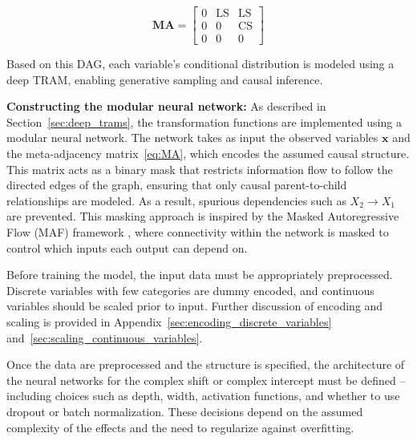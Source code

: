 \begin{equation}
\mathbf{MA} =
\begin{bmatrix}
  0 & \text{LS} & \text{LS} \\
  0 & 0  & \text{CS} \\
  0 & 0  & 0
\end{bmatrix}
\label{eq:MA}
\end{equation}

Based on this DAG, each variable's conditional distribution is modeled using a deep TRAM, enabling generative sampling and causal inference. 

% 

%
\textbf{Constructing the modular neural network:} As described in Section~\ref{sec:deep_trams}, the transformation functions are implemented using a modular neural network. The network takes as input the observed variables $\mathbf{x}$ and the meta-adjacency matrix~\ref{eq:MA}, which encodes the assumed causal structure. This matrix acts as a binary mask that restricts information flow to follow the directed edges of the graph, ensuring that only causal parent-to-child relationships are modeled. As a result, spurious dependencies such as $X_2 \rightarrow X_1$ are prevented. This masking approach is inspired by the Masked Autoregressive Flow (MAF) framework \citep{papamakarios2017}, where connectivity within the network is masked to control which inputs each output can depend on.

Before training the model, the input data must be appropriately preprocessed. Discrete variables with few categories are dummy encoded, and continuous variables should be scaled prior to input. Further discussion of encoding and scaling is provided in Appendix~\ref{sec:encoding_discrete_variables} and~\ref{sec:scaling_continuous_variables}.

Once the data are preprocessed and the structure is specified, the architecture of the neural networks for the complex shift or complex intercept must be defined -- including choices such as depth, width, activation functions, and whether to use dropout or batch normalization. These decisions depend on the assumed complexity of the effects and the need to regularize against overfitting.

